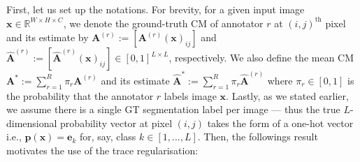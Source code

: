 First, let us set up the notations. For brevity, for a given input image $\mathbf{x} \in \mathbb{R}^{W\times H \times C}$, we denote the ground-truth CM of annotator $r$ at $(i, j)^{\text{th}}$ pixel and its estimate by $\textbf{A}^{(r)} := [\textbf{A}^{(r)}(\mathbf{x})_{ij}]$ and $\hat{\textbf{A}}^{(r)} := [\hat{\textbf{A}}^{(r)}(\mathbf{x})_{ij}] \in [0, 1]^{L\times L}$, respectively. We also define the mean CM $\textbf{A}^*:= \sum_{r=1}^R \pi_r \textbf{A}^{(r)}$ and its estimate $\hat{\textbf{A}}^{*}:=\sum_{r=1}^R \pi_r \hat{\textbf{A}}^{(r)}$ where $\pi_r\in [0,1]$ is the probability that the annotator $r$ labels image $\mathbf{x}$. Lastly, as we stated earlier, we assume there is a single GT segmentation label per image --- thus the true $L$-dimensional probability vector at pixel $(i, j)$ takes the form of a one-hot vector i.e., $\textbf{p}(\textbf{x}) = \mathbf{e}_k$ for, say, class $k \in [1, ...,L]$.  Then, the followings result motivates the use of the trace regularisation: 


\vspace{3mm}

